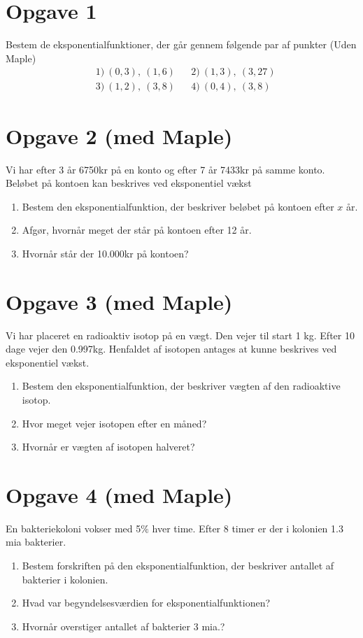 \section*{Opgave 1}
Bestem de eksponentialfunktioner, der går gennem følgende par af punkter (Uden Maple)
\begin{align*}
&1) \ (0,3), \ (1,6)  &&2) \ (1,3), \ (3,27)      \\
&3) \ (1,2), \  (3,8)   &&4) \  (0,4), \ (3,8)    
\end{align*}

\section*{Opgave 2 (med Maple)}
Vi har efter 3 år 6750kr på en konto og efter 7 år 7433kr på samme konto. Beløbet på kontoen kan beskrives ved eksponentiel vækst
\begin{enumerate}[label=\roman*)]
	\item Bestem den eksponentialfunktion, der beskriver beløbet på kontoen efter $x$ år.
	\item Afgør, hvornår meget der står på kontoen efter 12 år.
	\item Hvornår står der 10.000kr på kontoen?
\end{enumerate}


\section*{Opgave 3 (med Maple)}
Vi har placeret en radioaktiv isotop på en vægt. Den vejer til start 1 kg. Efter 10 dage vejer den 0.997kg. Henfaldet af isotopen antages at kunne beskrives ved eksponentiel vækst.
\begin{enumerate}[label=\roman*)]
	\item  Bestem den eksponentialfunktion, der beskriver vægten af den radioaktive isotop.
	\item Hvor meget vejer isotopen efter en måned?
	\item Hvornår er vægten af isotopen halveret?
\end{enumerate}

\section*{Opgave 4 (med Maple)}
En bakteriekoloni vokser med 5$\%$ hver time. Efter 8 timer er der i kolonien 1.3 mia bakterier. 
\begin{enumerate}[label=\roman*)]
	\item Bestem forskriften på den eksponentialfunktion, der beskriver antallet af bakterier i kolonien. 
	\item Hvad var begyndelsesværdien for eksponentialfunktionen?
	\item Hvornår overstiger antallet af bakterier 3 mia.?
\end{enumerate}

